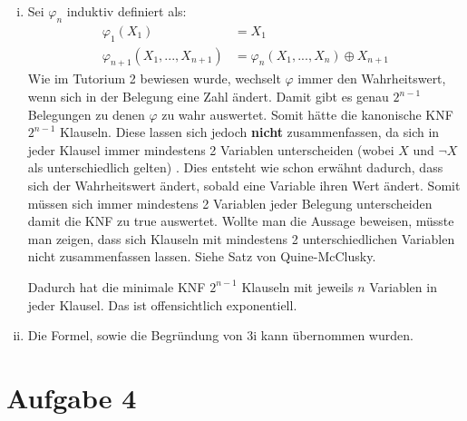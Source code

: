 \documentclass[a4paper,10pt]{article}
\begin{document}
\begin{enumerate}[(i)]
\item Sei $\varphi_n$ induktiv definiert als:
\begin{align*}
\varphi_1(X_1) &= X_1 \\
\varphi_{n+1}(X_1,...,X_{n+1}) &= \varphi_n(X_1,...,X_n) \oplus X_{n+1}
\end{align*}
Wie im Tutorium 2 bewiesen wurde, wechselt $\varphi$ immer den Wahrheitswert, wenn sich in der Belegung eine Zahl ändert. Damit gibt es genau $2^{n-1}$ Belegungen zu denen $\varphi$ zu wahr auswertet. Somit hätte die kanonische KNF $2^{n-1}$ Klauseln. Diese lassen sich jedoch \textbf{nicht} zusammenfassen, da sich in jeder Klausel immer mindestens 2 Variablen unterscheiden (wobei $X$ und $\lnot X$ als unterschiedlich gelten) . Dies entsteht wie schon erwähnt dadurch, dass sich der Wahrheitswert ändert, sobald eine Variable ihren Wert ändert. Somit müssen sich immer mindestens 2 Variablen jeder Belegung unterscheiden damit die KNF zu \textsf{true} auswertet. Wollte man die Aussage beweisen, müsste man zeigen, dass sich Klauseln mit mindestens 2 unterschiedlichen Variablen nicht zusammenfassen lassen. Siehe Satz von Quine-McClusky.

 Dadurch hat die minimale KNF $2^{n-1}$ Klauseln mit jeweils $n$ Variablen in jeder Klausel. Das ist offensichtlich exponentiell.

\item Die Formel, sowie die Begründung von 3i kann übernommen wurden.
\end{enumerate}

\section*{Aufgabe 4}
\end{document}
